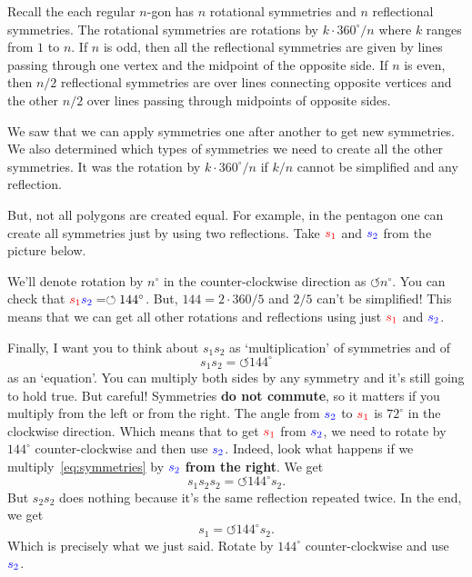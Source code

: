\documentclass[a4paper,11pt]{article}
\newcommand{\clr}{\textcolor{red}}
\newcommand{\clb}{\textcolor{blue}}
\begin{document}
Recall the each regular $n$-gon has $n$ rotational symmetries and $n$
reflectional symmetries. The rotational symmetries are rotations by $k \cdot
360^{ \circ } / n$ where $k$ ranges from $1$ to $n$. If $n$ is odd, then all the
reflectional symmetries are given by lines passing through one vertex and the
midpoint of the opposite side. If $n$ is even, then $n / 2$ reflectional
symmetries are over lines connecting opposite vertices and the other $n / 2$
over lines passing through midpoints of opposite sides.

We saw that we can apply symmetries one after another to get new symmetries. We
also determined which types of symmetries we need to create all the other
symmetries. It was the rotation by $k \cdot 360^{ \circ } / n$ if $k / n$ cannot
be simplified and any reflection.

But, not all polygons are created equal. For example, in the pentagon one can
create all symmetries just by using two reflections. Take $\clr{s_1}$ and
$\clb{s_2}$ from the picture below.

\begin{center}
\end{center}

We'll denote rotation by $n^{ \circ }$ in the counter-clockwise direction as
$\circlearrowleft n^{ \circ }$. You can check that $\clr{s_1}\clb{s_2} =
\circlearrowleft 144^{ \circ }$. But, $144 = 2 \cdot 360 / 5$ and $2 / 5$ can't
be simplified! This means that we can get all other rotations and reflections
using just $\clr{s_1}$ and $\clb{s_2}$.

Finally, I want you to think about $s_1s_2$ as `multiplication' of symmetries
and of
\begin{equation}
 \label{eq:symmetries}
 \tag{$*$}
 s_1s_2 = \circlearrowleft 144^{ \circ }
\end{equation}
as an `equation'. You can multiply both sides by any symmetry and it's still
going to hold true. But careful! Symmetries \textbf{do not commute}, so it
matters if you multiply from the left or from the right. The angle from
$\clb{s_2}$ to $\clr{s_1}$ is $72^{ \circ }$ in the clockwise direction. Which
means that to get $\clr{s_1}$ from $\clb{s_2}$, we need to rotate by $144^{
\circ }$ counter-clockwise and then use $\clb{s_2}$. Indeed, look what happens
if we multiply~\eqref{eq:symmetries} by $\clb{s_2}$ \textbf{from the right}. We
get
\[
 s_1s_2s_2 = \circlearrowleft 144^{ \circ }s_2.
\]
But $s_2s_2$ does nothing because it's the same reflection repeated twice. In
the end, we get
\[
 s_1 = \circlearrowleft 144^{ \circ }s_2.
\]
Which is precisely what we just said. Rotate by $144^{ \circ }$
counter-clockwise and use $\clb{s_2}$.
\end{document}
